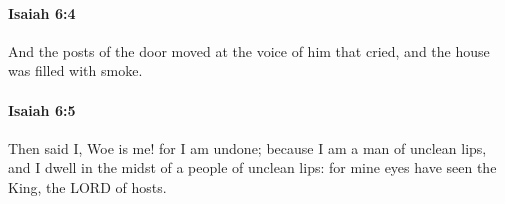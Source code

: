 		\paragraph{Isaiah 6:4} %
			\label{ISAIAH-6-4}

			And the posts of the door moved at the voice of him that cried, and the house was filled with smoke.


		\paragraph{Isaiah 6:5} %
			\label{ISAIAH-6-5}

			Then said I, Woe is me! for I am undone; because I am a man of unclean lips, and I dwell in the midst of a people of unclean lips: for mine eyes have seen the King, the LORD of hosts.


